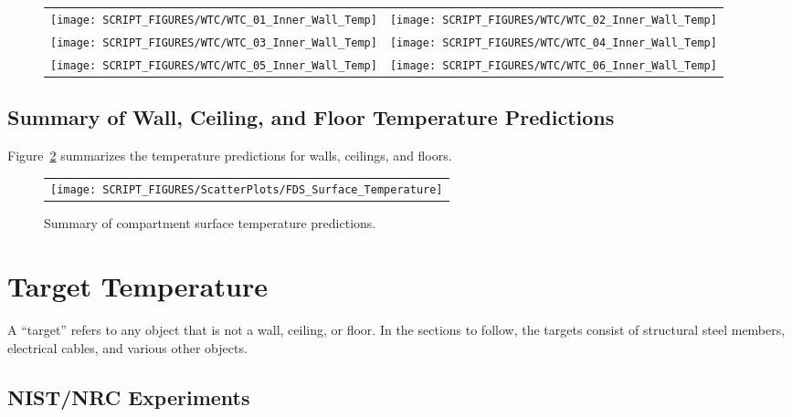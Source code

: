 \begin{figure}[p]
\begin{tabular*}{\textwidth}{l@{\extracolsep{\fill}}r}
\texttt{[image: SCRIPT\_FIGURES/WTC/WTC\_01\_Inner\_Wall\_Temp]} &
\texttt{[image: SCRIPT\_FIGURES/WTC/WTC\_02\_Inner\_Wall\_Temp]} \\
\texttt{[image: SCRIPT\_FIGURES/WTC/WTC\_03\_Inner\_Wall\_Temp]} &
\texttt{[image: SCRIPT\_FIGURES/WTC/WTC\_04\_Inner\_Wall\_Temp]} \\
\texttt{[image: SCRIPT\_FIGURES/WTC/WTC\_05\_Inner\_Wall\_Temp]} &
\texttt{[image: SCRIPT\_FIGURES/WTC/WTC\_06\_Inner\_Wall\_Temp]}
\end{tabular*}
\label{NIST_WTC_Inner_Wall}
\end{figure}

\clearpage

\subsection{Summary of Wall, Ceiling, and Floor Temperature Predictions}

Figure~\ref{Summary_Surface_Temperature} summarizes the temperature predictions for walls, ceilings, and floors.

\begin{figure}[h!]
\begin{center}
\begin{tabular}{c}
\texttt{[image: SCRIPT\_FIGURES/ScatterPlots/FDS\_Surface\_Temperature]}
\end{tabular}
\end{center}
\caption[Summary of compartment surface temperature predictions]
{Summary of compartment surface temperature predictions.}
\label{Summary_Surface_Temperature}
\end{figure}

\clearpage

\section{Target Temperature}

A ``target'' refers to any object that is not a wall, ceiling, or floor. In the sections to follow, the targets consist of structural steel members, electrical cables, and various other objects.

\subsection{NIST/NRC Experiments}

